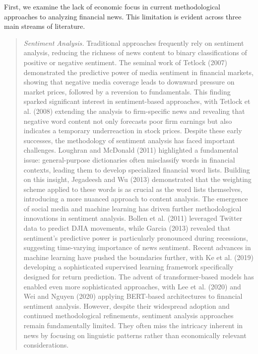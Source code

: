 \mx 
First, we examine the lack of economic focus in current methodological approaches to analyzing financial news. This limitation is evident across three main streams of literature.
\begin{quote}
\hspace{0.5cm} \textit{Sentiment Analysis.} 
Traditional approaches frequently rely on sentiment analysis, reducing the richness of news content to binary classifications of positive or negative sentiment. The seminal work of 
\cite{tetlock2007giving} Tetlock (2007) 
demonstrated the predictive power of media sentiment in financial markets, showing that negative media coverage leads to downward pressure on market prices, followed by a reversion to fundamentals. This finding sparked significant interest in sentiment-based approaches, with 
\cite{tetlock2008more} Tetlock et al. (2008) 
extending the analysis to firm-specific news and revealing that negative word content not only forecasts poor firm earnings but also indicates a temporary underreaction in stock prices.
Despite these early successes, the methodology of sentiment analysis has faced important challenges. 
%
\cite{loughran2011liability}  Loughran and McDonald (2011) 
highlighted a fundamental issue: general-purpose dictionaries often misclassify words in financial contexts, leading them to develop specialized financial word lists. Building on this insight, 
\cite{jegadeesh2013word}  Jegadeesh and Wu (2013) 
demonstrated that the weighting scheme applied to these words is as crucial as the word lists themselves, introducing a more nuanced approach to content analysis.
The emergence of social media and machine learning has driven further methodological innovations in sentiment analysis. 
\cite{bollen2011twitter}  Bollen et al. (2011) 
leveraged Twitter data to predict DJIA movements, while 
\cite{garcia2013sentiment}  Garcia (2013) 
revealed that sentiment's predictive power is particularly pronounced during recessions, suggesting time-varying importance of news sentiment. Recent advances in machine learning have pushed the boundaries further, with 
\cite{ke2019predicting}  Ke et al. (2019) 
developing a sophisticated supervised learning framework specifically designed for return prediction. The advent of transformer-based models has enabled even more sophisticated approaches, with 
\cite{lee2020bert}  Lee et al. (2020) 
and 
\cite{wei2018stock}  Wei and Nguyen (2020) 
applying BERT-based architectures to financial sentiment analysis.
%
However, despite their widespread adoption and continued methodological refinements, sentiment analysis approaches remain fundamentally limited. They often miss the intricacy inherent in news by focusing on linguistic patterns rather than economically relevant considerations. 


\end{quote}
